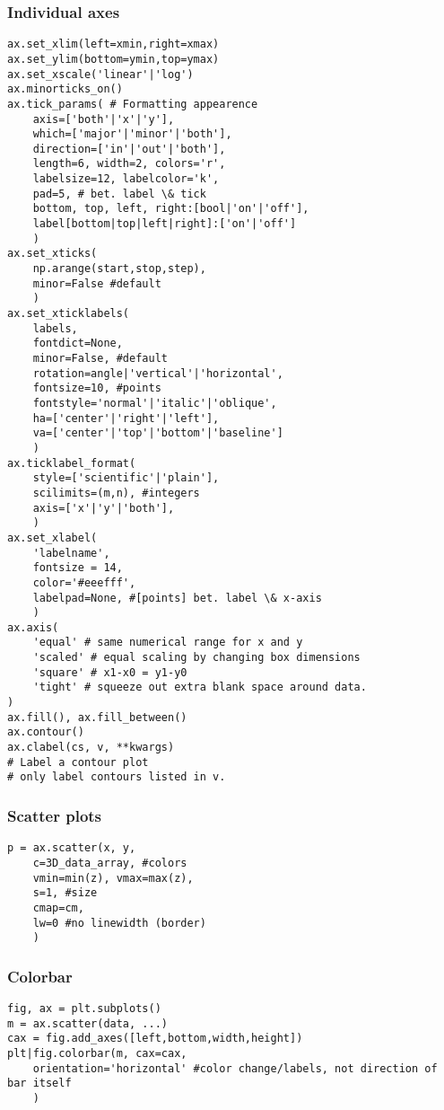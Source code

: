 \documentclass{article}
\begin{document}
\begin{multicols}{2}
\subsubsection{Individual axes}
\begin{lstlisting}
ax.set_xlim(left=xmin,right=xmax)
ax.set_ylim(bottom=ymin,top=ymax)
ax.set_xscale('linear'|'log')
ax.minorticks_on()
ax.tick_params( # Formatting appearence
    axis=['both'|'x'|'y'],
    which=['major'|'minor'|'both'],
    direction=['in'|'out'|'both'],
    length=6, width=2, colors='r',
    labelsize=12, labelcolor='k',
    pad=5, # bet. label \& tick
    bottom, top, left, right:[bool|'on'|'off'],
    label[bottom|top|left|right]:['on'|'off']
    )
ax.set_xticks(
    np.arange(start,stop,step),
    minor=False #default
    )
ax.set_xticklabels(
    labels,
    fontdict=None,
    minor=False, #default
    rotation=angle|'vertical'|'horizontal',
    fontsize=10, #points
    fontstyle='normal'|'italic'|'oblique',
    ha=['center'|'right'|'left'],
    va=['center'|'top'|'bottom'|'baseline']
    )
ax.ticklabel_format(
    style=['scientific'|'plain'],
    scilimits=(m,n), #integers
    axis=['x'|'y'|'both'],
    )
ax.set_xlabel(
    'labelname',
    fontsize = 14,
    color='#eeefff',
    labelpad=None, #[points] bet. label \& x-axis
    )
ax.axis(
    'equal' # same numerical range for x and y
    'scaled' # equal scaling by changing box dimensions
    'square' # x1-x0 = y1-y0
    'tight' # squeeze out extra blank space around data.
)
ax.fill(), ax.fill_between()
ax.contour()
ax.clabel(cs, v, **kwargs)
# Label a contour plot
# only label contours listed in v.
\end{lstlisting}

\newpage
\subsubsection{Scatter plots}
\begin{lstlisting}
p = ax.scatter(x, y,
    c=3D_data_array, #colors
    vmin=min(z), vmax=max(z),
    s=1, #size
    cmap=cm,
    lw=0 #no linewidth (border)
    )
\end{lstlisting}

\subsubsection{Colorbar}
\begin{lstlisting}
fig, ax = plt.subplots()
m = ax.scatter(data, ...)
cax = fig.add_axes([left,bottom,width,height])
plt|fig.colorbar(m, cax=cax,
    orientation='horizontal' #color change/labels, not direction of bar itself
    )
\end{lstlisting}


\end{multicols}
\end{document}
